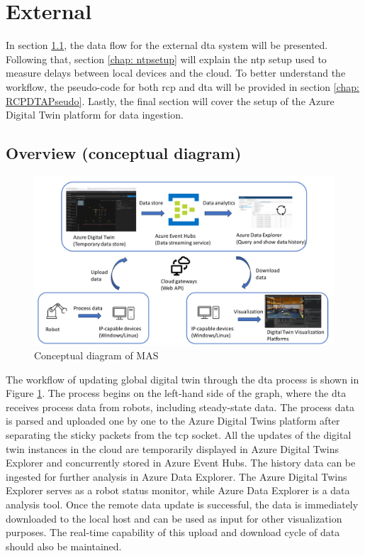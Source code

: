 \section{External} \label{chap: Meth-External}
In section \ref{chap: Overview-External}, the data flow for the external 
\gls{dta} system will be presented. Following that, section \ref{chap: ntpsetup} 
will explain the \gls{ntp} setup used to measure delays between local devices and 
the cloud. To better understand the workflow, the pseudo-code for both \gls{rcp} 
and \gls{dta} will be provided in section \ref{chap: RCPDTAPseudo}. Lastly, the 
final section will cover the setup of the Azure Digital Twin platform for data ingestion.



\subsection{Overview (conceptual diagram)}\label{chap: Overview-External}

\begin{figure}[htb]
\includegraphics[width=\textwidth]{figures/DT_Conceptual_Diagram.pdf}

\centering
\caption{Conceptual diagram of MAS\label{fig: DTConceptual}}
\end{figure}

The workflow of updating global digital twin through the \gls{dta} process is shown 
in Figure \ref{fig: DTConceptual}. The process begins on the left-hand side of the 
graph, where the \gls{dta} receives process data from robots, including steady-state 
data. The process data is parsed and uploaded one by one to the Azure Digital Twins 
platform after separating the sticky packets from the \gls{tcp} socket.
All the updates of the digital twin instances in the cloud are temporarily displayed 
in Azure Digital Twins Explorer and concurrently stored in Azure Event Hubs. The history 
data can be ingested for further analysis in Azure Data Explorer. The Azure Digital Twins 
Explorer serves as a robot status monitor, while Azure Data Explorer is a data analysis tool.
Once the remote data update is successful, the data is immediately downloaded to the local 
host and can be used as input for other visualization purposes. The real-time capability 
of this upload and download cycle of data should also be maintained.

